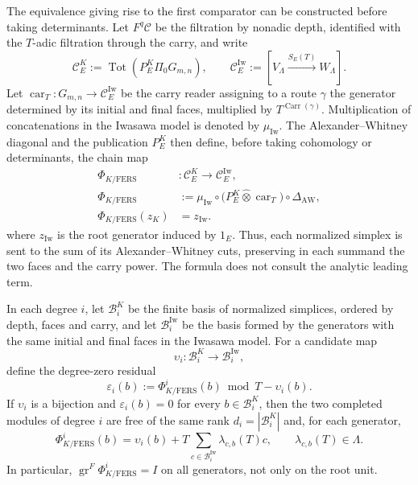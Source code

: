 The equivalence giving rise to the first comparator can be constructed before
taking determinants. Let \(F^q\mathcal C\) be the filtration by nonadic
depth, identified with the \(T\)-adic filtration through the carry, and
write
\begin{equation}\label{eq:amp-bsd-complejos-kato-iwasawa}
 \mathcal C_E^K
 :=\operatorname{Tot}\!\left(
 P_E^K\widehat\Pi_0G_{m,n}\right),
 \qquad
 \mathcal C_E^{\mathrm{Iw}}
 :=[V_\Lambda\xrightarrow{S_E(T)}W_\Lambda].
\end{equation}
Let
\(\operatorname{car}_T:G_{m,n}\to\mathcal C_E^{\mathrm{Iw}}\) be the carry
reader assigning to a route \(\gamma\) the generator determined by its
initial and final faces, multiplied by
\(T^{\operatorname{Carr}(\gamma)}\). Multiplication of concatenations in
the Iwasawa model is denoted by \(\mu_{\mathrm{Iw}}\). The Alexander--Whitney
diagonal and the publication \(P_E^K\) then define, before
taking cohomology or determinants, the chain map
\begin{equation}\label{eq:amp-bsd-phi-kato-fers}
\begin{aligned}
 \Phi_{K/\mathrm{FERS}}&:
 \mathcal C_E^K\longrightarrow\mathcal C_E^{\mathrm{Iw}},\\
 \Phi_{K/\mathrm{FERS}}
 &:=
 \mu_{\mathrm{Iw}}\circ
 \bigl(P_E^K\widehat\otimes\operatorname{car}_T\bigr)
 \circ\Delta_{\mathrm{AW}},\\
 \Phi_{K/\mathrm{FERS}}(z_K)&=z_{\mathrm{Iw}}.
\end{aligned}
\end{equation}
where \(z_{\mathrm{Iw}}\) is the root generator induced by \(1_E\). Thus,
each normalized simplex is sent to the sum of its Alexander--Whitney
cuts, preserving in each summand the two faces and the carry
power. The formula does not consult the analytic leading term.

\begin{lemma}
\label{lem:amp-bsd-bases-emparejadas-kato-fers}
In each degree \(i\), let \(\mathcal B_i^K\) be the finite basis of normalized
simplices, ordered by depth, faces and carry, and let
\(\mathcal B_i^{\mathrm{Iw}}\) be the basis formed by the generators with the
same initial and final faces in the Iwasawa model. For a candidate
map
\[
 \upsilon_i:\mathcal B_i^K\longrightarrow
 \mathcal B_i^{\mathrm{Iw}},
\]
define the degree-zero residual
\begin{equation}\label{eq:amp-bsd-residual-generador-graduado}
 \varepsilon_i(b)
 :=\Phi_{K/\mathrm{FERS}}^i(b)\bmod T-\upsilon_i(b).
\end{equation}
If \(\upsilon_i\) is a bijection and
\(\varepsilon_i(b)=0\) for every \(b\in\mathcal B_i^K\), then the two
completed modules of degree \(i\) are free of the same rank
\(d_i=|\mathcal B_i^K|\) and, for each generator,
\begin{equation}\label{eq:amp-bsd-phi-en-cada-generador}
 \Phi_{K/\mathrm{FERS}}^i(b)
 =\upsilon_i(b)
  +T\sum_{c\in\mathcal B_i^{\mathrm{Iw}}}
    \lambda_{c,b}(T)c,
 \qquad \lambda_{c,b}(T)\in\Lambda.
\end{equation}
In particular,
\(\operatorname{gr}^{F}\Phi_{K/\mathrm{FERS}}^i=I\) on all
generators, not only on the root unit.
\end{lemma}

